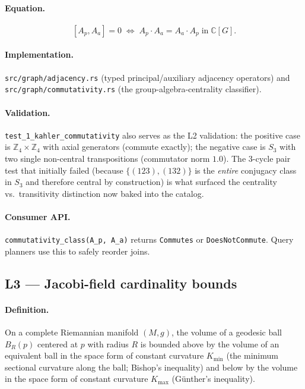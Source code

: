 \documentclass[11pt,letterpaper]{article}
\begin{document}
\paragraph{Equation.}
\[
[A_p, A_a] = 0 \;\Longleftrightarrow\;
A_p \cdot A_a = A_a \cdot A_p \;\text{in}\; \mathbb{C}[G].
\]

\paragraph{Implementation.}
\texttt{src/graph/adjacency.rs} (typed
principal/auxiliary adjacency operators) and
\texttt{src/graph/commutativity.rs} (the
group-algebra-centrality classifier).

\paragraph{Validation.}
\texttt{test\_1\_kahler\_commutativity} also serves as the L2
validation: the positive case is $\mathbb{Z}_4 \times \mathbb{Z}_4$
with axial generators (commute exactly); the negative case is $S_3$
with two single non-central transpositions (commutator norm $1.0$).
The 3-cycle pair test that initially failed (because
$\{(123), (132)\}$ is the \emph{entire} conjugacy class in $S_3$ and
therefore central by construction) is what surfaced the centrality
vs.\ transitivity distinction now baked into the catalog.

\paragraph{Consumer API.}
\texttt{commutativity\_class(A\_p, A\_a)} returns
\texttt{Commutes} or \texttt{DoesNotCommute}. Query planners use
this to safely reorder joins.


\subsection{L3 --- Jacobi-field cardinality bounds}

\paragraph{Definition.}
On a complete Riemannian manifold $(M, g)$, the volume of a
geodesic ball $B_R(p)$ centered at $p$ with radius $R$ is bounded
above by the volume of an equivalent ball in the space form of
constant curvature $K_{\min}$ (the minimum sectional curvature
along the ball; Bishop's inequality) and below by the volume in the
space form of constant curvature $K_{\max}$ (G\"unther's
inequality).
\end{document}
